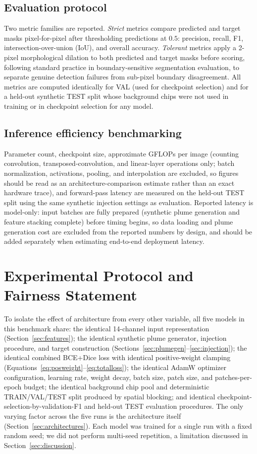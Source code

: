 \documentclass[10pt,twocolumn]{article}
\begin{document}
\subsection{Evaluation protocol}

Two metric families are reported. \emph{Strict} metrics compare predicted and target masks pixel-for-pixel after thresholding predictions at $0.5$: precision, recall, F1, intersection-over-union (IoU), and overall accuracy. \emph{Tolerant} metrics apply a 2-pixel morphological dilation to both predicted and target masks before scoring, following standard practice in boundary-sensitive segmentation evaluation, to separate genuine detection failures from sub-pixel boundary disagreement. All metrics are computed identically for VAL (used for checkpoint selection) and for a held-out synthetic TEST split whose background chips were not used in training or in checkpoint selection for any model.

\subsection{Inference efficiency benchmarking}

Parameter count, checkpoint size, approximate GFLOPs per image (counting convolution, transposed-convolution, and linear-layer operations only; batch normalization, activations, pooling, and interpolation are excluded, so figures should be read as an architecture-comparison estimate rather than an exact hardware trace), and forward-pass latency are measured on the held-out TEST split using the same synthetic injection settings as evaluation. Reported latency is model-only: input batches are fully prepared (synthetic plume generation and feature stacking complete) before timing begins, so data loading and plume generation cost are excluded from the reported numbers by design, and should be added separately when estimating end-to-end deployment latency.

\section{Experimental Protocol and Fairness Statement}
\label{sec:protocol}

To isolate the effect of architecture from every other variable, all five models in this benchmark share: the identical 14-channel input representation (Section~\ref{sec:features}); the identical synthetic plume generator, injection procedure, and target construction (Sections~\ref{sec:plumegen}--\ref{sec:injection}); the identical combined BCE+Dice loss with identical positive-weight clamping (Equations~\eqref{eq:posweight}--\eqref{eq:totalloss}); the identical AdamW optimizer configuration, learning rate, weight decay, batch size, patch size, and patches-per-epoch budget; the identical background chip pool and deterministic TRAIN/VAL/TEST split produced by spatial blocking; and identical checkpoint-selection-by-validation-F1 and held-out TEST evaluation procedures. The only varying factor across the five runs is the architecture itself (Section~\ref{sec:architectures}). Each model was trained for a single run with a fixed random seed; we did not perform multi-seed repetition, a limitation discussed in Section~\ref{sec:discussion}.
\end{document}
